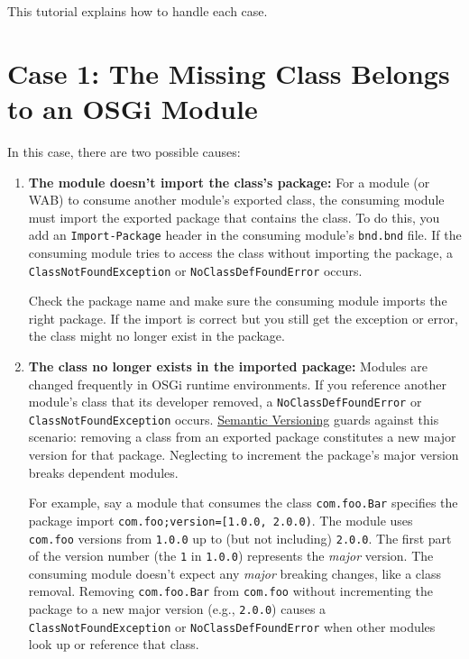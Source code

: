 This tutorial explains how to handle each case.

\section{Case 1: The Missing Class Belongs to an OSGi
Module}\label{case-1-the-missing-class-belongs-to-an-osgi-module}

In this case, there are two possible causes:

\begin{enumerate}
\def\labelenumi{\arabic{enumi}.}
\item
  \textbf{The module doesn't import the class's package:} For a module
  (or WAB) to consume another module's exported class, the consuming
  module must import the exported package that contains the class. To do
  this, you add an \texttt{Import-Package} header in the consuming
  module's \texttt{bnd.bnd} file. If the consuming module tries to
  access the class without importing the package, a
  \texttt{ClassNotFoundException} or \texttt{NoClassDefFoundError}
  occurs.

  Check the package name and make sure the consuming module imports the
  right package. If the import is correct but you still get the
  exception or error, the class might no longer exist in the package.
\item
  \textbf{The class no longer exists in the imported package:} Modules
  are changed frequently in OSGi runtime environments. If you reference
  another module's class that its developer removed, a
  \texttt{NoClassDefFoundError} or \texttt{ClassNotFoundException}
  occurs. \href{http://semver.org}{Semantic Versioning} guards against
  this scenario: removing a class from an exported package constitutes a
  new major version for that package. Neglecting to increment the
  package's major version breaks dependent modules.

  For example, say a module that consumes the class \texttt{com.foo.Bar}
  specifies the package import
  \texttt{com.foo;version={[}1.0.0,\ 2.0.0)}. The module uses
  \texttt{com.foo} versions from \texttt{1.0.0} up to (but not
  including) \texttt{2.0.0}. The first part of the version number (the
  \texttt{1} in \texttt{1.0.0}) represents the \emph{major} version. The
  consuming module doesn't expect any \emph{major} breaking changes,
  like a class removal. Removing \texttt{com.foo.Bar} from
  \texttt{com.foo} without incrementing the package to a new major
  version (e.g., \texttt{2.0.0}) causes a
  \texttt{ClassNotFoundException} or \texttt{NoClassDefFoundError} when
  other modules look up or reference that class.


\end{enumerate}
